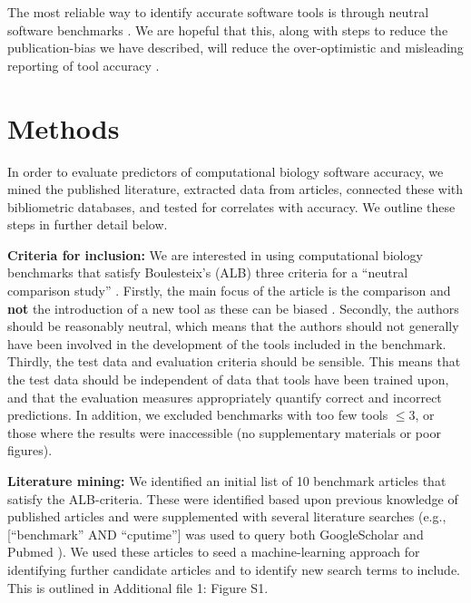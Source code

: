\documentclass{bmcart}
\begin{document}
The most reliable way to identify accurate software tools is through neutral
software benchmarks \cite{Boulesteix2013-vb}. We are hopeful that
this, along with steps to reduce the publication-bias we have
described, will reduce the over-optimistic and misleading reporting of
tool accuracy \cite{Boulesteix2010-te,Jelizarow2010-zf,Norel2011-cq}.


\section*{Methods}
In order to evaluate predictors of computational biology software
accuracy, we mined the published literature, extracted data from
articles, connected these with bibliometric databases, and tested for
correlates with accuracy. We outline these steps in further detail
below.

\textbf{Criteria for inclusion:} We are interested in using
computational biology benchmarks that satisfy Boulesteix’s (ALB) three
criteria for a ``neutral comparison study''
\cite{Boulesteix2013-vb}. Firstly, the main focus of the article is
the comparison and \textbf{not} the introduction of a new tool
{\color{red}as these can be biased} \cite{Buchka:2021a}. Secondly, the
authors should be reasonably neutral, which means that the authors
should not generally have been involved in the development of the
tools included in the benchmark. Thirdly, the test data and evaluation
criteria should be sensible. This means that the test data should be
independent of data that tools have been trained upon, and that the
evaluation measures appropriately quantify correct and incorrect
predictions. {\color{red} In addition, we excluded benchmarks with too
  few tools $\le 3$, or those where the results were inaccessible (no
  supplementary materials or poor figures).}

\textbf{Literature mining:} We identified an initial list of 10 benchmark
articles that satisfy the ALB-criteria. These were identified based
upon previous knowledge of published articles and were supplemented
with several literature searches (e.g., [``benchmark'' AND ``cputime''] was
used to query both GoogleScholar and Pubmed
\cite{Sayers2010-vm,McEntyre2001-fl}). We used these articles to seed
a machine-learning approach for identifying further candidate articles
and to identify new search terms to include. {\color{red}This is outlined in Additional file 1: Figure S1. }
\end{document}
